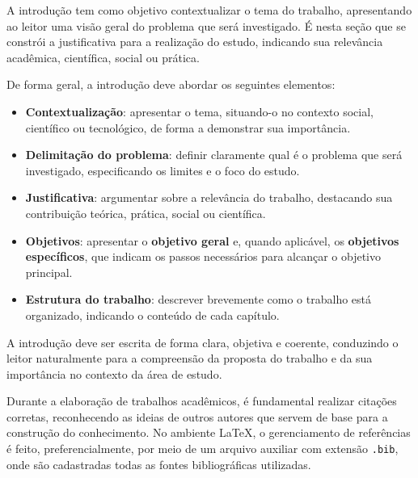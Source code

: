 \label{sec:introducao}

A introdução tem como objetivo contextualizar o tema do trabalho, apresentando ao leitor uma visão geral do problema que será investigado. É nesta seção que se constrói a justificativa para a realização do estudo, indicando sua relevância acadêmica, científica, social ou prática.

De forma geral, a introdução deve abordar os seguintes elementos:

\begin{itemize}
    \item \textbf{Contextualização}: apresentar o tema, situando-o no contexto social, científico ou tecnológico, de forma a demonstrar sua importância.

    \item \textbf{Delimitação do problema}: definir claramente qual é o problema que será investigado, especificando os limites e o foco do estudo.

    \item \textbf{Justificativa}: argumentar sobre a relevância do trabalho, destacando sua contribuição teórica, prática, social ou científica.

    \item \textbf{Objetivos}: apresentar o \textbf{objetivo geral} e, quando aplicável, os \textbf{objetivos específicos}, que indicam os passos necessários para alcançar o objetivo principal.

    \item \textbf{Estrutura do trabalho}: descrever brevemente como o trabalho está organizado, indicando o conteúdo de cada capítulo.
\end{itemize}

A introdução deve ser escrita de forma clara, objetiva e coerente, conduzindo o leitor naturalmente para a compreensão da proposta do trabalho e da sua importância no contexto da área de estudo.

\label{subsec:citref}

Durante a elaboração de trabalhos acadêmicos, é fundamental realizar citações corretas, reconhecendo as ideias de outros autores que servem de base para a construção do conhecimento. No ambiente \LaTeX, o gerenciamento de referências é feito, preferencialmente, por meio de um arquivo auxiliar com extensão \texttt{.bib}, onde são cadastradas todas as fontes bibliográficas utilizadas.


